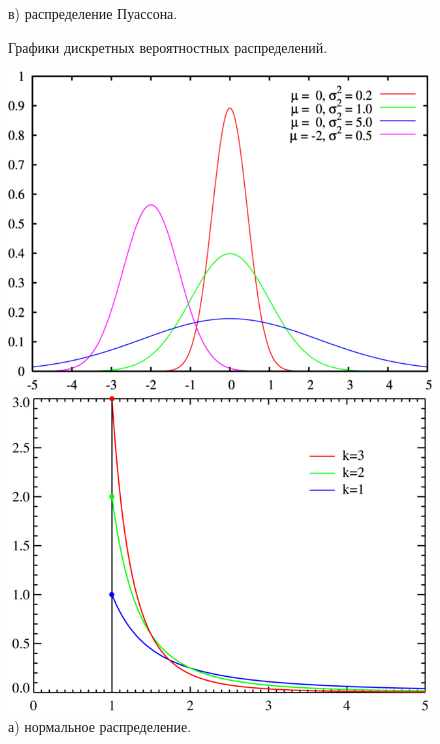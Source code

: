 \documentclass[14pt, russian]{scrartcl}
\begin{document}
\begin{figure}[H]
\begin{minipage}[t]{.45\textwidth}
		\caption*{в) распределение Пуассона.}
	\end{minipage}
	\caption{Графики дискретных вероятностных распределений.}
	\label{fig:distr_1}
\end{figure}

\begin{figure}[H]
	\centering
	\begin{minipage}[t]{.45\textwidth}
		\centering
		\includegraphics[width=\linewidth]{./img/norm.png}
		\caption*{а) нормальное распределение.}
	\end{minipage}
	\noindent
	\begin{minipage}[t]{.45\textwidth}
		\centering
		\includegraphics[width=\linewidth]{./img/paretto.png}

\end{minipage}
\end{figure}
\end{document}
